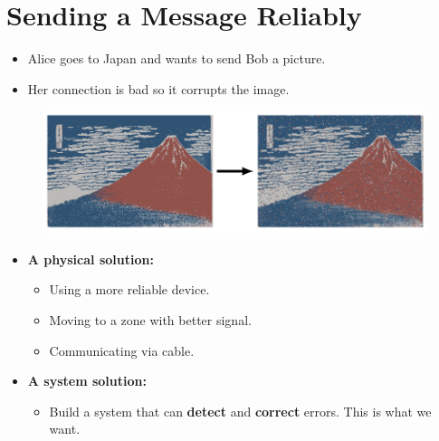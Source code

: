 

\section{Sending a Message Reliably}
\begin{itemize}
    \item Alice goes to Japan and wants to send Bob a picture.
    \item Her connection is bad so it corrupts the image.
\end{itemize}
\begin{figure}[h]
    \includegraphics[width=\linewidth]{img/corrupt.png}
\end{figure}

\begin{itemize}
    \item\textbf{A physical solution:}
    \begin{itemize}
        \item Using a more reliable device.
        \item Moving to a zone with better signal.
        \item Communicating via cable.
    \end{itemize}
    \item\textbf{A system solution:}
    \begin{itemize}
        \item Build a system that can \textbf{detect} and \textbf{correct} errors. This is what we want.
    \end{itemize}
\end{itemize}

